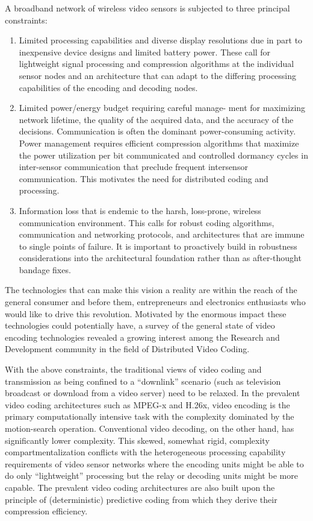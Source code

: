 \documentclass[letterpaper,12pt,titlepage,oneside,final]{report}
\begin{document}
        A broadband network of wireless video sensors is subjected to three principal constraints:
        \begin{enumerate}
            \item {Limited processing capabilities and diverse display resolutions due in part to inexpensive device designs and limited battery power. These call for lightweight signal processing and compression algorithms at the individual sensor nodes and an architecture that can adapt to the differing processing capabilities of the encoding and decoding nodes.}
            \item {Limited power/energy budget requiring careful manage- ment for maximizing network lifetime, the quality of the acquired data, and the accuracy of the decisions. Communication is often the dominant power-consuming activity. Power management requires efficient compression algorithms that maximize the power utilization per bit communicated and controlled dormancy cycles in inter-sensor communication that preclude frequent intersensor communication. This motivates the need for distributed coding and processing.}
            \item {Information loss that is endemic to the harsh, loss-prone, wireless communication environment. This calls for robust coding algorithms, communication and networking protocols, and architectures that are immune to single points of failure. It is important to proactively build in robustness considerations into the architectural foundation rather than as after-thought bandage fixes.}
        \end{enumerate}

        The technologies that can make this vision a reality are within the reach of the general consumer and before them, entrepreneurs and electronics enthusiasts who would like to drive this revolution. Motivated by the enormous impact these technologies could potentially have, a survey of the general state of video encoding technologies revealed a growing interest among the Research and Development community in the field of Distributed Video Coding. 

        With the above constraints, the traditional views of video coding and transmission as being confined to a “downlink” scenario (such as television broadcast or download from a video server) need to be relaxed. In the prevalent video coding architectures such as MPEG-x and H.26x, video encoding is the primary computationally intensive task with the complexity dominated by the motion-search operation. Conventional video decoding, on the other hand, has significantly lower complexity. This skewed, somewhat rigid, complexity compartmentalization conflicts with the heterogeneous processing capability requirements of video sensor networks where the encoding units might be able to do only “lightweight” processing but the relay or decoding units might be more capable. The prevalent video coding architectures are also built upon the principle of (deterministic) predictive coding from which they derive their compression efficiency. 
\end{document}
